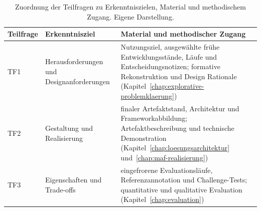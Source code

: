 %   

\begin{table}[tbp]
\centering

\caption[Methodische Zuordnung der Teilfragen]
{Zuordnung der Teilfragen zu Erkenntniszielen, Material und methodischem
Zugang. Eigene Darstellung.}
\label{t:methodischer-zugang-teilfragen}

\small
\renewcommand{\arraystretch}{1.15}

\begin{tabularx}{\textwidth}{
    >{\raggedright\arraybackslash}p{}
    >{\raggedright\arraybackslash}p{}
    >{\raggedright\arraybackslash}X
}
\toprule
\textbf{Teilfrage} &
\textbf{Erkenntnisziel} &
\textbf{Material und methodischer Zugang} \\
\midrule

TF1 &
Herausforderungen und Designanforderungen &
Nutzungsziel, ausgewählte frühe Entwicklungsstände, Läufe und
Entscheidungsnotizen;
formative Rekonstruktion und Design Rationale (Kapitel~\ref{chap:explorative-problemklaerung}) \\
\addlinespace[0.4em]

TF2 &
Gestaltung und Realisierung &
finaler Artefaktstand, Architektur und Frameworkabbildung;
Artefaktbeschreibung und technische Demonstration (Kapitel~\ref{chap:loesungsarchitektur} und~\ref{chap:maf-realisierung}) \\
\addlinespace[0.4em]

TF3 &
Eigenschaften und Trade-offs &
eingefrorene Evaluationsläufe, Referenzannotation und Challenge-Tests;
quantitative und qualitative Evaluation (Kapitel~\ref{chap:evaluation}) \\

\bottomrule
\end{tabularx}
\end{table}

